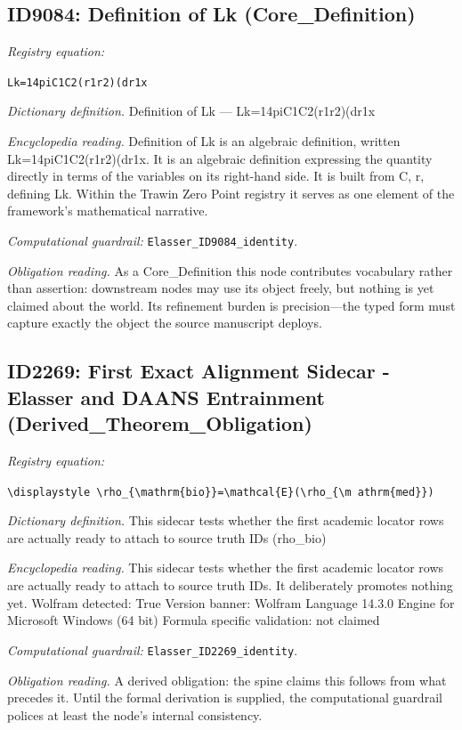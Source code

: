 \documentclass[11pt]{article}
\theoremstyle{remark}
\begin{document}
\subsection{ID9084: Definition of Lk (Core\_Definition)}

\noindent\textit{Registry equation:}\par
{\small\texttt{Lk=14piC1C2(r1r2)(dr1x}}\par\medskip
\noindent\textit{Dictionary definition.} Definition of Lk --- Lk=14piC1C2(r1r2)(dr1x\par\medskip
\noindent\textit{Encyclopedia reading.} Definition of Lk is an algebraic definition, written Lk=14piC1C2(r1r2)(dr1x. It is an algebraic definition expressing the quantity directly in terms of the variables on its right-hand side. It is built from C, r, defining Lk. Within the Trawin Zero Point registry it serves as one element of the framework's mathematical narrative.
\par\medskip\noindent\textit{Computational guardrail:} \texttt{Elasser\_ID9084\_identity}.
\par\medskip\noindent\textit{Obligation reading.} As a Core\_Definition this node contributes vocabulary rather than assertion: downstream nodes may use its object freely, but nothing is yet claimed about the world. Its refinement burden is precision---the typed form must capture exactly the object the source manuscript deploys.

\subsection{ID2269: First Exact Alignment Sidecar - Elasser and DAANS Entrainment (Derived\_Theorem\_Obligation)}

\noindent\textit{Registry equation:}\par
{\small\texttt{\textbackslash{}displaystyle \textbackslash{}rho\_\{\textbackslash{}mathrm\{bio\}\}=\textbackslash{}mathcal\{E\}(\textbackslash{}rho\_\{\textbackslash{}m athrm\{med\}\})}}\par\medskip
\noindent\textit{Dictionary definition.} This sidecar tests whether the first academic locator rows are actually ready to attach to source truth IDs (rho\_bio)\par\medskip
\noindent\textit{Encyclopedia reading.} This sidecar tests whether the first academic locator rows are actually ready to attach to source truth IDs. It deliberately promotes nothing yet. Wolfram detected: True Version banner: Wolfram Language 14.3.0 Engine for Microsoft Windows (64 bit) Formula specific validation: not claimed
\par\medskip\noindent\textit{Computational guardrail:} \texttt{Elasser\_ID2269\_identity}.
\par\medskip\noindent\textit{Obligation reading.} A derived obligation: the spine claims this follows from what precedes it. Until the formal derivation is supplied, the computational guardrail polices at least the node's internal consistency.
\end{document}
